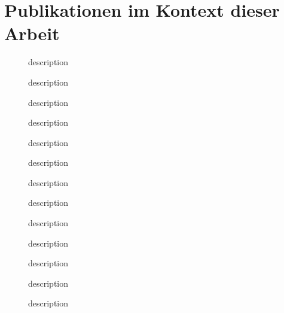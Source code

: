 \chapter*{Publikationen im Kontext dieser Arbeit}

\begin{description}
	\item[\citet{Oppl05a}] description
	\item[\citet{Oppl06}] description
	\item[\citet{Oppl06a}] description 
	\item[\citet{Oppl07b}] description
	\item[\citet{Oppl07}] description
	\item[\citet{Oppl07a}] description
	\item[\citet{Furtmuller07a}] description
	\item[\citet{Oppl08}] description
	\item[\citet{Oppl08a}] description
	\item[\citet{Oppl09}] description
	\item[\citet{Oppl09b}] description
	\item[\citet{Oppl09c}] description
	\item[\citet{Oppl09d}] description
\end{description}
